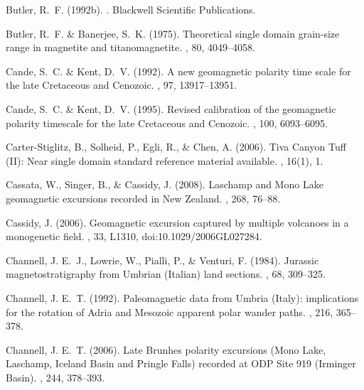 Butler, R.~F. (1992b).
.
\newblock Blackwell Scientific Publications.

Butler, R.~F. \& Banerjee, S.~K. (1975).
\newblock Theoretical single domain grain-size range in magnetite and
  titanomagnetite.
, 80, 4049--4058.

Cande, S.~C. \& Kent, D.~V. (1992).
\newblock A new geomagnetic polarity time scale for the late Cretaceous and
  Cenozoic.
, 97, 13917--13951.

Cande, S.~C. \& Kent, D.~V. (1995).
\newblock Revised calibration of the geomagnetic polarity timescale for the
  late Cretaceous and Cenozoic.
, 100, 6093--6095.

Carter-Stiglitz, B., Solheid, P., Egli, R., \& Chen, A. (2006).
\newblock Tiva Canyon Tuff (II): Near single domain standard reference material
  available.
, 16(1), 1.

Cassata, W., Singer, B., \& Cassidy, J. (2008).
\newblock Laschamp and Mono Lake geomagnetic excursions recorded in New
  Zealand.
, 268, 76--88.

Cassidy, J. (2006).
\newblock Geomagnetic excursion captured by multiple volcanoes in a monogenetic
  field.
, 33, L1310, doi:10.1029/2006GL027284.

Channell, J. E.~J., Lowrie, W., Pialli, P., \& Venturi, F. (1984).
\newblock Jurassic magnetostratigraphy from Umbrian (Italian) land sections.
, 68, 309--325.

Channell, J. E.~T. (1992).
\newblock Paleomagnetic data from Umbria (Italy): implications for the rotation
  of Adria and Mesozoic apparent polar wander paths.
, 216, 365--378.

Channell, J. E.~T. (2006).
\newblock Late Brunhes polarity excursions (Mono Lake, Laschamp, Iceland Basin
  and Pringle Falls) recorded at ODP Site 919 (Irminger Basin).
, 244, 378--393.

